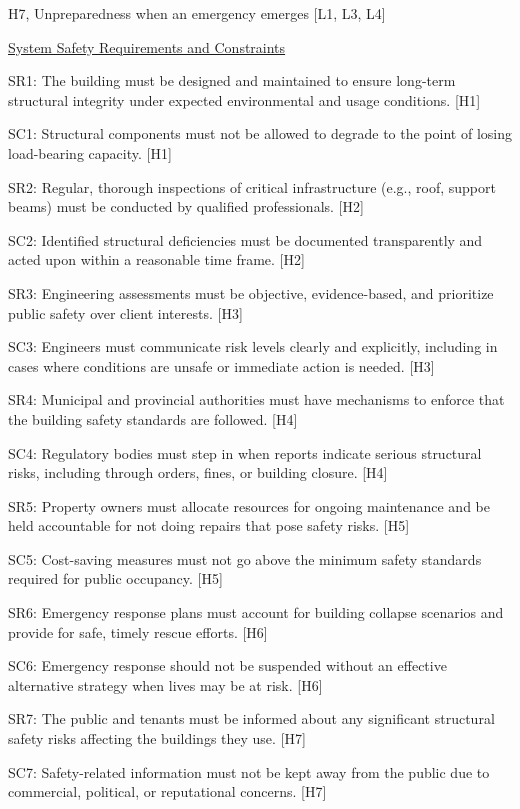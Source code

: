 \documentclass[12pt]{article}
\begin{document}
H7, Unpreparedness when an emergency emerges [L1, L3, L4]

\underline{System Safety Requirements and Constraints}

SR1: The building must be designed and maintained to ensure long-term structural integrity under expected environmental and usage conditions. [H1]

SC1: Structural components must not be allowed to degrade to the point of losing load-bearing capacity. [H1]

SR2: Regular, thorough inspections of critical infrastructure (e.g., roof, support beams) must be conducted by qualified professionals. [H2]

SC2: Identified structural deficiencies must be documented transparently and acted upon within a reasonable time frame. [H2]

SR3: Engineering assessments must be objective, evidence-based, and prioritize public safety over client interests. [H3]

SC3: Engineers must communicate risk levels clearly and explicitly, including in cases where conditions are unsafe or immediate action is needed. [H3]

SR4: Municipal and provincial authorities must have mechanisms to enforce that the building safety standards are followed. [H4]

SC4: Regulatory bodies must step in when reports indicate serious structural risks, including through orders, fines, or building closure. [H4]

SR5: Property owners must allocate resources for ongoing maintenance and be held accountable for not doing repairs that pose safety risks. [H5]

SC5: Cost-saving measures must not go above the minimum safety standards required for public occupancy. [H5]

SR6: Emergency response plans must account for building collapse scenarios and provide for safe, timely rescue efforts. [H6]

SC6: Emergency response should not be suspended without an effective alternative strategy when lives may be at risk. [H6]

SR7: The public and tenants must be informed about any significant structural safety risks affecting the buildings they use. [H7]

SC7: Safety-related information must not be kept away from the public due to commercial, political, or reputational concerns. [H7]
\end{document}
